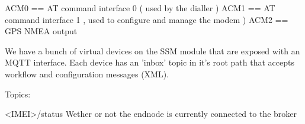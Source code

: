 ACM0 == AT command interface 0 ( used by the dialler )
ACM1 == AT command interface 1 , used to configure and manage the modem )
ACM2 == GPS NMEA output



We have a bunch of virtual devices on the SSM module that are exposed with an
MQTT interface. Each device has an 'inbox' topic in it's root path that accepts
workflow and configuration messages (XML).

Topics:

<IMEI>/status
Wether or not the endnode is currently connected to the broker




    
    
    
    
    
    
    
    
    
    
    
    
    
    
    
    
    
    
    
    